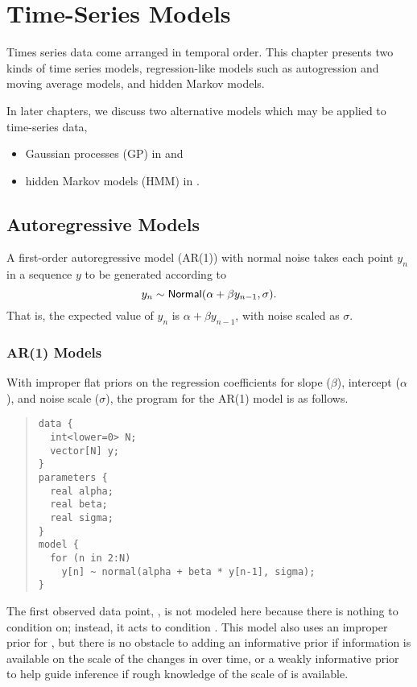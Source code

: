   




\chapter{Time-Series Models}

\noindent
Times series data come arranged in temporal order.  This chapter
presents two kinds of time series models, regression-like models such
as autogression and moving average models, and hidden Markov models. 

In later chapters, we discuss two alternative models which may be
applied to time-series data, 
%
\begin{itemize}
\item Gaussian processes (GP) in  and 
\item hidden Markov models (HMM) in .
\end{itemize}


\section{Autoregressive Models}

A first-order autoregressive model (AR(1)) with normal noise takes
each point $y_n$ in a sequence $y$ to be generated according to
%
\[
y_n \sim \mbox{\sf Normal}(\alpha + \beta y_{n-1}, \sigma).
\]
%
That is, the expected value of $y_n$ is $\alpha + \beta y_{n-1}$, with
noise scaled as $\sigma$.

\subsection{AR(1) Models}

With improper flat priors on the regression coefficients for slope
($\beta$), intercept ($\alpha$), and noise scale ($\sigma$),
the \Stan program for the AR(1) model is as follows.
%
\begin{quote}
\begin{Verbatim}[fontsize=\small]
data {
  int<lower=0> N;
  vector[N] y;
}
parameters {
  real alpha;
  real beta;
  real sigma;
}
model {
  for (n in 2:N)
    y[n] ~ normal(alpha + beta * y[n-1], sigma);
}
\end{Verbatim}
\end{quote}
%
The first observed data point, , is not modeled here
because there is nothing to condition on; instead, it acts to
condition .  This model also uses an improper prior for
, but there is no obstacle to adding an informative prior
if information is available on the scale of the changes in 
over time, or a weakly informative prior to help guide inference if
rough knowledge of the scale of  is available.

